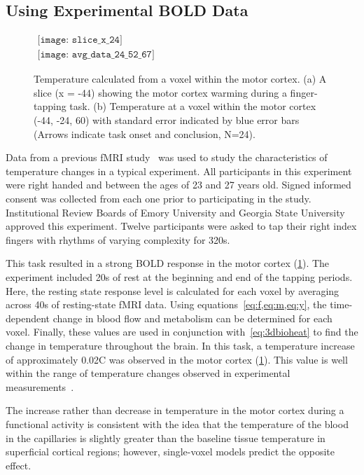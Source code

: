     \subsection{\label{sec:experimentalresults} Using Experimental BOLD Data}
    \FloatBarrier
    \begin{figure}[p] 
    	\begin{center}
    		$ 
    		\begin{array}{c}
    			\texttt{[image: slice\_x\_24]} \\
    			\texttt{[image: avg\_data\_24\_52\_67]} 
    		\end{array}
    		$ 
    	\end{center}
    	\caption[Temperature changes: experimental BOLD data]{\label{fig:realdata} Temperature calculated from a voxel within the motor cortex. (a) A slice (x = -44) showing the motor cortex warming during a finger-tapping task. (b) Temperature at a voxel within the motor cortex (-44, -24, 60) with standard error indicated by blue error bars (Arrows indicate task onset and conclusion, N=24).} 
    \end{figure}
    Data from a previous fMRI study~\citep{dhamala} was used to study the characteristics of temperature changes in a typical experiment. All participants in this experiment were right handed and between the ages of 23 and 27 years old.  Signed informed consent was collected from each one prior to participating in the study.  Institutional Review Boards of Emory University and Georgia State University approved this experiment. Twelve participants were asked to tap their right index fingers with rhythms of varying complexity for 320s. 
    
    This task resulted in a strong BOLD response in the motor cortex (\cref{fig:realdata}). The experiment included 20s of rest at the beginning and end of the tapping periods. Here, the resting state response level is calculated for each voxel by averaging across 40s of resting-state fMRI data. Using equations~\cref{eq:f,eq:m,eq:y}, the time-dependent change in blood flow and metabolism can be determined for each voxel. Finally, these values are used in conjunction with~\cref{eq:3dbioheat} to find the change in temperature throughout the brain. In this task, a temperature increase of approximately 0.02\degree C was observed in the motor cortex (\cref{fig:realdata}).  This value is well within the range of temperature changes observed in experimental measurements~\citep{mcelligott,kiyatkin,zeschke,george,tachibana}. 
    
    The increase rather than decrease in temperature in the motor cortex during a functional activity is consistent with the idea that the temperature of the blood in the capillaries is slightly greater than the baseline tissue temperature in superficial cortical regions; however, single-voxel models predict the opposite effect.